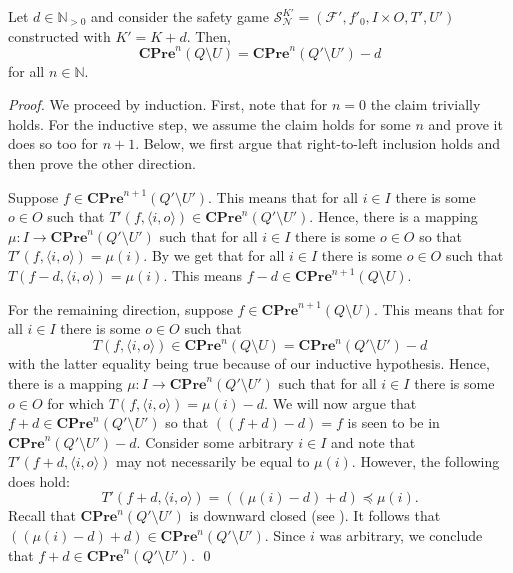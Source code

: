 \documentclass[runningheads,a4paper,draft]{llncs}
\newcommand{\cpre}{\mathbf{CPre}}
\newcommand{\calF}{\mathcal{F}}
\newcommand{\calN}{\mathcal{N}}
\newcommand{\calS}{\mathcal{S}}
\begin{document}
\begin{lemma}\label{lem:eq-games}
  Let $d \in \mathbb{N}_{>0}$ and consider the safety game $\calS^{K'}_\calN =
  (\calF',f'_0,I \times O,T',U')$ constructed with $K' = K + d$. Then,
  \[\cpre^n(Q\setminus U) = \cpre^n(Q'\setminus U') - d\] for all $n \in
  \mathbb{N}$.
\end{lemma}
\begin{proof}
  We proceed by induction. First, note that for $n = 0$ the claim trivially
  holds. For the inductive step, we assume the claim holds for some $n$ and
  prove it does so too for $n + 1$. 
  Below, we first argue that right-to-left inclusion holds and then
  prove the other direction.

  Suppose $f \in \cpre^{n+1}(Q'\setminus U')$. This means that for all $i \in I$
  there is some $o \in O$ such that $T'(f,\langle i , o \rangle) \in
  \cpre^{n}(Q' \setminus U')$. Hence, there is a mapping $\mu : I \to
  \cpre^n(Q' \setminus U')$ such that for all $i \in I$ there is some $o \in
  O$ so that $T'(f,\langle i , o \rangle) = \mu(i)$. By
    we get that for all $i \in I$
  there is some $o \in O$ such that $T(f - d, \langle i, o \rangle) = \mu(i)$.
  This means $f - d \in \cpre^{n+1}(Q\setminus U)$.

  For the remaining direction, suppose $f \in \cpre^{n+1}(Q \setminus U)$.
  This means that for all $i \in I$ there is some $o \in O$ such that 
  \[
    T(f, \langle i , o \rangle) \in \cpre^n(Q \setminus U) =
    \cpre^n(Q'\setminus U') -d 
  \]
  with the latter equality being true because of our inductive hypothesis.
  Hence, there is a mapping $\mu : I \to \cpre^n(Q' \setminus U')$ such that
  for all $i \in I$ there is some $o \in O$ for which $T(f, \langle i, o
  \rangle) = \mu(i) - d$. We will now argue that $f + d \in \cpre^n(Q'
  \setminus U')$ so that $((f+d)-d) = f$ is seen to be in $\cpre^n(Q'
  \setminus U') - d$. Consider some arbitrary $i \in I$ and 
  note that $T'(f + d, \langle i , o \rangle)$ may not
  necessarily be equal to $\mu(i)$. However, the following does hold:
  \[
    T'(f+d, \langle i , o \rangle) = ((\mu(i) -d) + d) \preceq \mu(i).
  \]
  Recall that $\cpre^n(Q' \setminus U')$ is downward closed (see
  ). It follows that $((\mu(i) -d ) + d) \in \cpre^n(Q'
  \setminus U')$. Since $i$ was arbitrary, we conclude that $f + d \in
  \cpre^n(Q' \setminus U')$. \qed
\end{proof}
\end{document}
